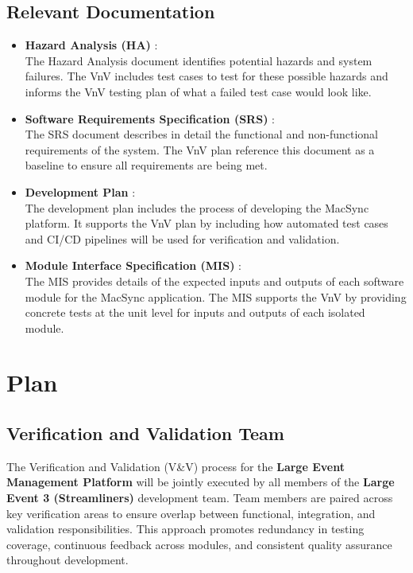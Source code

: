 \documentclass[12pt, titlepage]{article}
\begin{document}
\subsection{Relevant Documentation}

\begin{itemize}
    \item \textbf{Hazard Analysis (HA)} \citet{SL-HA}:\\
    The Hazard Analysis document identifies potential hazards and system failures. The VnV includes test cases to test for these possible hazards and informs the VnV testing plan of what a failed test case would look like.
    \item \textbf{Software Requirements Specification (SRS)} \citet{SL-SRS}:  \\
    The SRS document describes in detail the functional and non-functional requirements of the system. The VnV plan reference this document as a baseline to ensure all requirements are being met.
    \item \textbf{Development Plan} \citet{SL-DEVPLAN}:\\
    The development plan includes the process of developing the MacSync platform. It supports the VnV plan by including how automated test cases and CI/CD pipelines will be used for verification and validation.
    \item \textbf{Module Interface Specification (MIS) } \citet{SL-MIS}:\\
    The MIS provides details of the expected inputs and outputs of each software module for the MacSync application. The MIS supports the VnV by providing concrete tests at the unit level for inputs and outputs of each isolated module.
\end{itemize}

\section{Plan}


\subsection{Verification and Validation Team}

The Verification and Validation (V\&V) process for the \textbf{Large Event Management Platform} will be jointly executed by all members of the \textbf{Large Event 3 (Streamliners)} development team. Team members are paired across key verification areas to ensure overlap between functional, integration, and validation responsibilities. This approach promotes redundancy in testing coverage, continuous feedback across modules, and consistent quality assurance throughout development.
\end{document}

